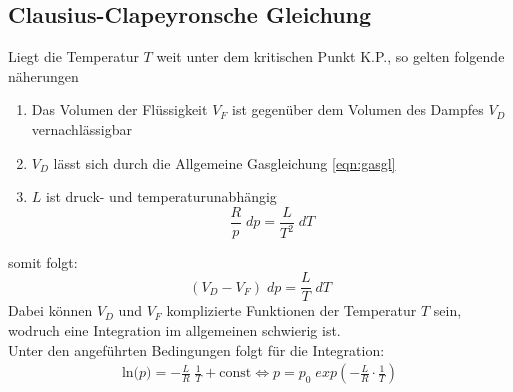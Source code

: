 \subsection{Clausius-Clapeyronsche Gleichung}
Liegt die Temperatur $T$ weit unter dem kritischen Punkt K.P., so gelten folgende näherungen
\begin{enumerate}
    \item Das Volumen der Flüssigkeit $V_F$ ist gegenüber dem Volumen des Dampfes $V_D$ vernachlässigbar
    \item $V_D$ lässt sich durch die Allgemeine Gasgleichung \ref{eqn:gasgl}
    \item $L$ ist druck- und temperaturunabhängig
    \begin{equation}
        \frac{R}{p}\;dp=\frac{L}{T^2}\;dT
    \end{equation}
\end{enumerate}
somit folgt:
\begin{equation}
    (V_D-V_F)\;dp=\frac{L}{T}\;dT
\end{equation}
Dabei können $V_D$ und $V_F$ komplizierte Funktionen der Temperatur $T$ sein, wodruch eine 
Integration im allgemeinen schwierig ist.\\
Unter den angeführten Bedingungen folgt für die Integration:
\begin{gather}
    \textrm{ln($p$)} = -\frac{L}{R}\;\frac{1}{T}+\textrm{const}
   \Longleftrightarrow p=p_0\;exp(-\frac{L}{R}\cdot \frac{1}{T})
\end{gather}